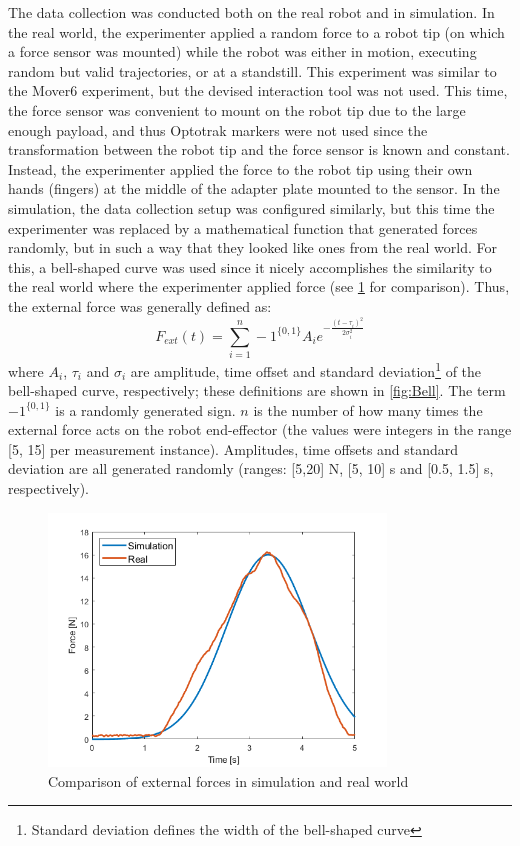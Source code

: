 The data collection was conducted both on the real robot and in simulation. In the real world, the experimenter applied a random force to a robot tip (on which a force sensor was mounted) while the robot was either in motion, executing random but valid trajectories, or at a standstill. This experiment was similar to the Mover6 experiment, but the devised interaction tool was not used. This time, the force sensor was convenient to mount on the robot tip due to the large enough payload, and thus Optotrak markers were not used since the transformation between the robot tip and the force sensor is known and constant. Instead, the experimenter applied the force to the robot tip using their own hands (fingers) at the middle of the adapter plate mounted to the sensor. In the simulation, the data collection setup was configured similarly, but this time the experimenter was replaced by a mathematical function that generated forces randomly, but in such a way that they looked like ones from the real world. For this, a bell-shaped curve was used since it nicely accomplishes the similarity to the real world where the experimenter applied force (see \cref{fig:FextSimReal} for comparison). Thus, the external force was generally defined as:
\[
F_{ext}(t) = \sum^n_{i=1}-1^{\{0,1\}}A_i e^{-\frac{(t-\tau_i)^2}{2\sigma_i^2}}
\]
where $A_i$, $\tau_i$ and $\sigma_i$ are amplitude, time offset and standard deviation\footnote{Standard deviation defines the width of the bell-shaped curve} of the bell-shaped curve, respectively; these definitions are shown in \cref{fig:Bell}. The term $-1^{\{0,1\}}$ is a randomly generated sign. $n$ is the number of how many times the external force acts on the robot end-effector (the values were integers in the range [5, 15] per measurement instance). Amplitudes, time offsets and standard deviation are all generated randomly (ranges: [5,20] N, [5, 10] s and [0.5, 1.5] s, respectively). 

\begin{figure}
    \centering
    \includegraphics[width=0.8\textwidth]{slike/simvsreal.png}
    \caption{Comparison of external forces in simulation and real world}
    \label{fig:FextSimReal}
\end{figure}

